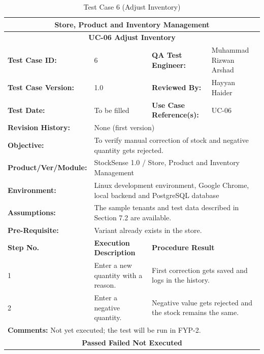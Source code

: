 \documentclass{StockSense}
\begin{document}
\begin{table}[!htbp]
\centering
\caption{Test Case 6 (Adjust Inventory)}
{\small\linespread{1}\selectfont\renewcommand{\arraystretch}{1.25}
\begin{tabular}{|p{}|p{}|p{}|p{}|}
\hline
\multicolumn{4}{|c|}{\textbf{Store, Product and Inventory Management}} \\ \hline
\multicolumn{4}{|c|}{\textbf{UC-06 Adjust Inventory}} \\ \hline
\textbf{Test Case ID:} & 6 & \textbf{QA Test Engineer:} & Muhammad Rizwan Arshad \\ \hline
\textbf{Test Case Version:} & 1.0 & \textbf{Reviewed By:} & Hayyan Haider \\ \hline
\textbf{Test Date:} & To be filled & \textbf{Use Case Reference(s):} & UC-06 \\ \hline
\textbf{Revision History:} & \multicolumn{3}{p{\dimexpr0.70\textwidth+4\tabcolsep\relax}|}{None (first version)} \\ \hline
\textbf{Objective:} & \multicolumn{3}{p{\dimexpr0.70\textwidth+4\tabcolsep\relax}|}{To verify manual correction of stock and negative quantity gets rejected.} \\ \hline
\textbf{Product/Ver/Module:} & \multicolumn{3}{p{\dimexpr0.70\textwidth+4\tabcolsep\relax}|}{StockSense 1.0 / Store, Product and Inventory Management} \\ \hline
\textbf{Environment:} & \multicolumn{3}{p{\dimexpr0.70\textwidth+4\tabcolsep\relax}|}{Linux development environment, Google Chrome, local backend and PostgreSQL database} \\ \hline
\textbf{Assumptions:} & \multicolumn{3}{p{\dimexpr0.70\textwidth+4\tabcolsep\relax}|}{The sample tenants and test data described in Section 7.2 are available.} \\ \hline
\textbf{Pre-Requisite:} & \multicolumn{3}{p{\dimexpr0.70\textwidth+4\tabcolsep\relax}|}{Variant already exists in the store.} \\ \hline
\textbf{Step No.} & \textbf{Execution Description} & \multicolumn{2}{l|}{\textbf{Procedure Result}} \\ \hline
1 & Enter a new quantity with a reason. & \multicolumn{2}{p{\dimexpr0.42\textwidth+2\tabcolsep\relax}|}{First correction gets saved and logs in the history.} \\ \hline
2 & Enter a negative quantity. & \multicolumn{2}{p{\dimexpr0.42\textwidth+2\tabcolsep\relax}|}{Negative value gets rejected and the stock remains the same.} \\ \hline
\multicolumn{4}{|l|}{\textbf{Comments:} Not yet executed; the test will be run in FYP-2.} \\ \hline
\multicolumn{4}{|c|}{\textbf{Passed \quad Failed \quad Not Executed}} \\ \hline
\end{tabular}\par}
\end{table}
\end{document}
